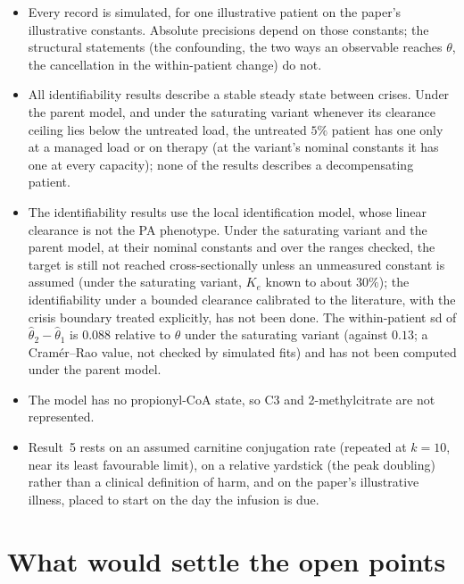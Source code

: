 \documentclass[11pt,a4paper]{article}
\begin{document}
\begin{itemize}
\item Every record is simulated, for one illustrative patient on the paper's illustrative
constants. Absolute precisions depend on those constants; the structural statements (the
confounding, the two ways an observable reaches $\theta$, the cancellation in the within-patient change)
do not.
\item All identifiability results describe a stable steady state between crises. Under the
parent model, and under the saturating variant whenever its clearance ceiling lies below the
untreated load, the untreated $5\%$ patient has one only at a managed load or on therapy (at
the variant's nominal constants it has one at every capacity); none of the results describes a
decompensating patient.
\item The identifiability results use the local identification model, whose linear
clearance is not the PA phenotype. Under the saturating variant and the parent model, at
their nominal constants and over the ranges checked, the target is still not reached
cross-sectionally unless an unmeasured constant is assumed (under the saturating variant, $K_e$
known to about $30\%$); the identifiability under a bounded clearance calibrated to the
literature, with the crisis boundary treated explicitly, has not been done. The
within-patient sd of $\hat\theta_2-\hat\theta_1$ is $0.088$ relative to $\theta$ under the saturating variant (against $0.13$; a Cram\'er--Rao value, not checked by simulated fits) and has not been computed
under the parent model.
\item The model has no propionyl-CoA state, so C3 and 2-methylcitrate are not represented.
\item Result~5 rests on an assumed carnitine conjugation rate (repeated at $k=10$, near its
least favourable limit), on a relative yardstick (the peak doubling) rather than a clinical
definition of harm, and on the paper's illustrative illness, placed to start on the day the
infusion is due.
\end{itemize}

\section{What would settle the open points}
\end{document}
